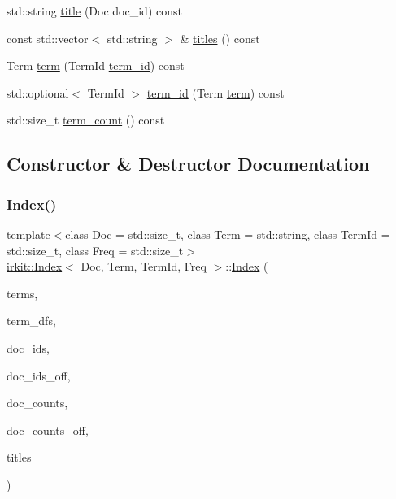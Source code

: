 \begin{DoxyCompactItemize}
\item 
std\+::string \mbox{\hyperlink{classirkit_1_1Index_a6a4d5f7860e2359b89270d20302e6f0b}{title}} (Doc doc\+\_\+id) const
\item 
const std\+::vector$<$ std\+::string $>$ \& \mbox{\hyperlink{classirkit_1_1Index_a632caff9525484c5d453d016c5cb586e}{titles}} () const
\item 
Term \mbox{\hyperlink{classirkit_1_1Index_a62050b0a8c8556262b82a45be1ae0262}{term}} (Term\+Id \mbox{\hyperlink{classirkit_1_1Index_a753cf658f5464ae7f19e8e12831abc65}{term\+\_\+id}}) const
\item 
std\+::optional$<$ Term\+Id $>$ \mbox{\hyperlink{classirkit_1_1Index_a753cf658f5464ae7f19e8e12831abc65}{term\+\_\+id}} (Term \mbox{\hyperlink{classirkit_1_1Index_a62050b0a8c8556262b82a45be1ae0262}{term}}) const
\item 
std\+::size\+\_\+t \mbox{\hyperlink{classirkit_1_1Index_a3051984667589401814296f54e72e32c}{term\+\_\+count}} () const
\end{DoxyCompactItemize}


\subsection{Constructor \& Destructor Documentation}
\mbox{\label{classirkit_1_1Index_aae374f9921cbbb42642e1a8c8f338c75}} 
\subsubsection{\texorpdfstring{Index()}{Index()}\hspace{0.1cm}{\footnotesize\ttfamily [1/2]}}
{\footnotesize\ttfamily template$<$class Doc  = std\+::size\+\_\+t, class Term  = std\+::string, class Term\+Id  = std\+::size\+\_\+t, class Freq  = std\+::size\+\_\+t$>$ \\
\mbox{\hyperlink{classirkit_1_1Index}{irkit\+::\+Index}}$<$ Doc, Term, Term\+Id, Freq $>$\+::\mbox{\hyperlink{classirkit_1_1Index}{Index}} (\begin{DoxyParamCaption}\item[{std\+::vector$<$ Term $>$}]{terms,  }\item[{std\+::vector$<$ Freq $>$}]{term\+\_\+dfs,  }\item[{std\+::vector$<$ char $>$}]{doc\+\_\+ids,  }\item[{\mbox{\hyperlink{classirkit_1_1io_1_1OffsetTable}{io\+::\+Offset\+Table}}$<$$>$}]{doc\+\_\+ids\+\_\+off,  }\item[{std\+::vector$<$ char $>$}]{doc\+\_\+counts,  }\item[{\mbox{\hyperlink{classirkit_1_1io_1_1OffsetTable}{io\+::\+Offset\+Table}}$<$$>$}]{doc\+\_\+counts\+\_\+off,  }\item[{std\+::vector$<$ std\+::string $>$}]{titles }\end{DoxyParamCaption})\hspace{0.3cm}{\ttfamily [inline]}}

